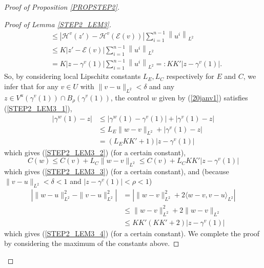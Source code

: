 \documentclass[JEP,XML,SOM,Unicode,NoFloatCountersInSection,published]{cedram}
\theoremstyle{definition}
\begin{document}
\begin{proof}[Proof of Proposition \ref{PROPSTEP2}]
\begin{proof}[Proof of Lemma \ref{STEP2_LEM3}]
\begin{align*}
& \leq  \left| \mathcal{H}^v(z') - \mathcal{H}^v(\mathcal{E}(v))\right| \sum_{i=1}^{n-1} \left\|u^i\right\|_{L^2} \\
& \leq  K \left|z' -\mathcal{E}(v) \right| \sum_{i=1}^{n-1} \left\|u^i\right\|_{L^2} \\
& =  K \left|z -\gamma^v(1)\right| \sum_{i=1}^{n-1} \left\|u^i\right\|_{L^2} =: KK' |z -\gamma^v(1)|.
\end{align*}
So, by considering local Lipschitz constants $L_E, L_C$ respectively for $E$ and $C$, we infer that for any $v\in U$ with $\|v-u\|_{L^2} < \delta$ and any $z\in V^{u}(\gamma^v(1)) \cap B_{\rho}(\gamma^v(1))$, the control $w$ given by (\ref{20janv1}) satisfies (\ref{STEP2_LEM3_1}),
\begin{align*}
\left| \gamma^w(1)-z \right| & \leq  \left| \gamma^w(1)-\gamma^v(1) \right| + |\gamma^v(1)-z| \\
& \leq L_E \|w-v\|_{L^2} + |\gamma^v(1)-z| \\
& =  (L_EKK'+1) \left|z -\gamma^v(1)\right|
\end{align*}
which gives (\ref{STEP2_LEM3_2}) (for a certain constant),
\[
C(w) \leq C(v) + L_C \|w-v\|_{L^2} \leq C(v) + L_CK K' \left|z - \gamma^v(1)\right|
\]
which gives (\ref{STEP2_LEM3_3}) (for a certain constant), and (because $\|v-u\|_{L^2} < \delta<1$ and $|z-\gamma^v(1)|<\rho<1$)
\begin{align*}
\left| \| w- u\|_{L^2}^2 - \| v-u\|_{L^2}^2 \right| & =  \left| \| w-v\|_{L^2}^2 + 2 \langle w-v,v-u\rangle_{L^2}\right| \\
& \leq  \| w-v\|_{L^2}^2 + 2 \| w-v\|_{L^2}\\
& \leq  KK' (KK'+2)\left|z - \gamma^v(1)\right|
\end{align*}
which gives (\ref{STEP2_LEM3_4}) (for a certain constant). We complete the proof by considering the maximum of the constants above.


\end{proof}
\end{proof}
\end{document}
